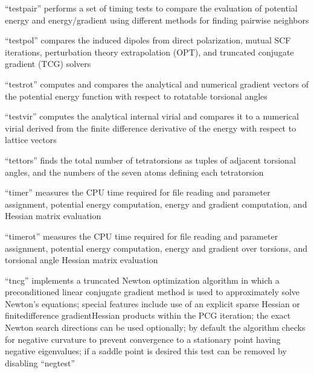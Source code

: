 \documentclass[letterpaper,11pt,english]{sphinxmanual}
\begin{document}
\sphinxAtStartPar
“testpair” performs a set of timing tests to compare the evaluation of potential energy and energy/gradient using different methods for finding pairwise neighbors

\sphinxAtStartPar
{}

\sphinxAtStartPar
“testpol” compares the induced dipoles from direct polarization, mutual SCF iterations, perturbation theory extrapolation (OPT), and truncated conjugate gradient (TCG) solvers

\sphinxAtStartPar
{}

\sphinxAtStartPar
“testrot” computes and compares the analytical and numerical gradient vectors of the potential energy function with respect to rotatable torsional angles

\sphinxAtStartPar
{}

\sphinxAtStartPar
“testvir” computes the analytical internal virial and compares it to a numerical virial derived from the finite difference derivative of the energy with respect to lattice vectors

\sphinxAtStartPar
{}

\sphinxAtStartPar
“tettors” finds the total number of tetratorsions as tuples of adjacent torsional angles, and the numbers of the seven atoms defining each tetratorsion

\sphinxAtStartPar
{}

\sphinxAtStartPar
“timer” measures the CPU time required for file reading and parameter assignment, potential energy computation, energy and gradient computation, and Hessian matrix evaluation

\sphinxAtStartPar
{}

\sphinxAtStartPar
“timerot” measures the CPU time required for file reading and parameter assignment, potential energy computation, energy and gradient over torsions, and torsional angle Hessian matrix evaluation

\sphinxAtStartPar
{}

\sphinxAtStartPar
“tncg” implements a truncated Newton optimization algorithm in which a preconditioned linear conjugate gradient method is used to approximately solve Newton’s equations; special features include use of an explicit sparse Hessian or finite\sphinxhyphen{}difference gradient\sphinxhyphen{}Hessian products within the PCG iteration; the exact Newton search directions can be used optionally; by default the algorithm checks for negative curvature to prevent convergence to a stationary point having negative eigenvalues; if a saddle point is desired this test can be removed by disabling “negtest”
\end{document}

